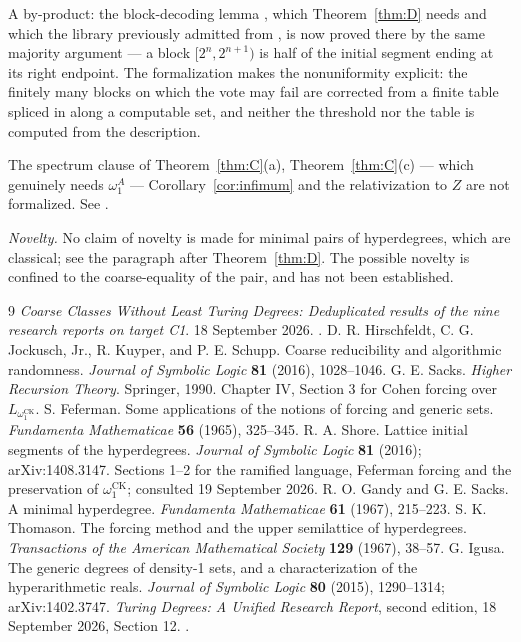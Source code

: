\documentclass[11pt,letterpaper]{article}
\theoremstyle{definition}
\numberwithin{equation}{section}
\newcommand{\omck}{\omega_1^{\mathrm{CK}}}
\begin{document}
A by-product: the block-decoding lemma \cite[Lemma 3.4]{Synthesis}, which Theorem~\ref{thm:D} needs and which the library previously admitted from \cite[Section 2]{HJKS}, is now proved there by the same majority argument --- a block $[2^n,2^{n+1})$ is half of the initial segment ending at its right endpoint. The formalization makes the nonuniformity explicit: the finitely many blocks on which the vote may fail are corrected from a finite table spliced in along a computable set, and neither the threshold nor the table is computed from the description.

The spectrum clause of Theorem~\ref{thm:C}(a), Theorem~\ref{thm:C}(c) --- which genuinely needs $\omega_1^A$ --- Corollary~\ref{cor:infimum} and the relativization to $Z$ are not formalized. See .

\emph{Novelty.} No claim of novelty is made for minimal pairs of hyperdegrees, which are classical; see the paragraph after Theorem~\ref{thm:D}. The possible novelty is confined to the coarse-equality of the pair, and has not been established.

\begingroup\raggedright\small
\begin{thebibliography}{9}
\emph{Coarse Classes Without Least Turing Degrees: Deduplicated results of the nine research reports on target C1}. 18 September 2026. .
D. R. Hirschfeldt, C. G. Jockusch, Jr., R. Kuyper, and P. E. Schupp. Coarse reducibility and algorithmic randomness. \emph{Journal of Symbolic Logic} \textbf{81} (2016), 1028--1046.
G. E. Sacks. \emph{Higher Recursion Theory}. Springer, 1990. Chapter IV, Section 3 for Cohen forcing over $L_{\omck}$.
S. Feferman. Some applications of the notions of forcing and generic sets. \emph{Fundamenta Mathematicae} \textbf{56} (1965), 325--345.
R. A. Shore. Lattice initial segments of the hyperdegrees. \emph{Journal of Symbolic Logic} \textbf{81} (2016); arXiv:1408.3147. Sections 1--2 for the ramified language, Feferman forcing and the preservation of $\omck$; consulted 19 September 2026.
R. O. Gandy and G. E. Sacks. A minimal hyperdegree. \emph{Fundamenta Mathematicae} \textbf{61} (1967), 215--223.
S. K. Thomason. The forcing method and the upper semilattice of hyperdegrees. \emph{Transactions of the American Mathematical Society} \textbf{129} (1967), 38--57.
G. Igusa. The generic degrees of density-1 sets, and a characterization of the hyperarithmetic reals. \emph{Journal of Symbolic Logic} \textbf{80} (2015), 1290--1314; arXiv:1402.3747.
\emph{Turing Degrees: A Unified Research Report}, second edition, 18 September 2026, Section 12. .
\end{thebibliography}
\endgroup
\end{document}
